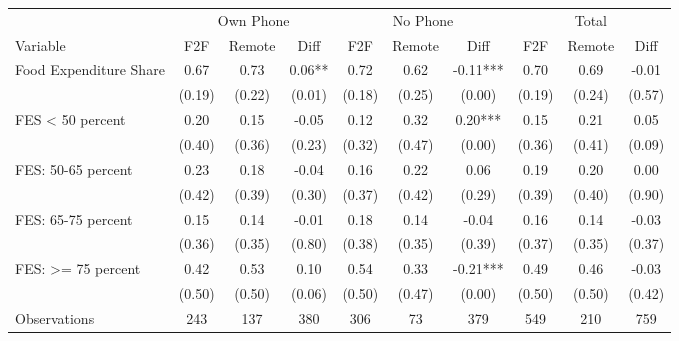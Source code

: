 \begin{tabular}{l*{9}c}
\hline\hline
 & \multicolumn{3}{c}{Own Phone} & \multicolumn{3}{c}{No Phone} & \multicolumn{3}{c}{Total}\\ 
Variable & F2F & Remote & Diff & F2F & Remote & Diff & F2F & Remote & Diff \\
\hline
Food Expenditure Share&0.67&0.73&0.06**&0.72&0.62&-0.11***&0.70&0.69&-0.01\\
&(0.19)&(0.22)&(0.01)&(0.18)&(0.25)&(0.00)&(0.19)&(0.24)&(0.57)\\
FES < 50 percent&0.20&0.15&-0.05&0.12&0.32&0.20***&0.15&0.21&0.05\\
&(0.40)&(0.36)&(0.23)&(0.32)&(0.47)&(0.00)&(0.36)&(0.41)&(0.09)\\
FES: 50-65 percent&0.23&0.18&-0.04&0.16&0.22&0.06&0.19&0.20&0.00\\
&(0.42)&(0.39)&(0.30)&(0.37)&(0.42)&(0.29)&(0.39)&(0.40)&(0.90)\\
FES: 65-75 percent&0.15&0.14&-0.01&0.18&0.14&-0.04&0.16&0.14&-0.03\\
&(0.36)&(0.35)&(0.80)&(0.38)&(0.35)&(0.39)&(0.37)&(0.35)&(0.37)\\
FES: >= 75 percent&0.42&0.53&0.10&0.54&0.33&-0.21***&0.49&0.46&-0.03\\
&(0.50)&(0.50)&(0.06)&(0.50)&(0.47)&(0.00)&(0.50)&(0.50)&(0.42)\\
\hline
Observations & 243 & 137 & 380 & 306 & 73 & 379 & 549 & 210 & 759 \\
\hline\hline
\end{tabular}
